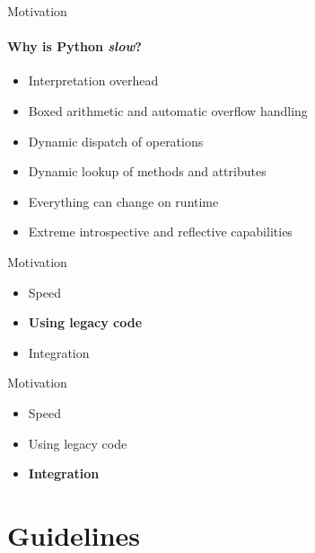 \documentclass{beamer}
\begin{document}
\begin{frame}{Motivation}
\framesubtitle{Why is Python \textit{slow}?}
  \begin{itemize}
    \item Interpretation overhead
    \item Boxed arithmetic and automatic overflow handling
    \item Dynamic dispatch of operations
    \item Dynamic lookup of methods and attributes
    \item Everything can change on runtime
    \item Extreme introspective and reflective capabilities
  \end{itemize}
\end{frame}

\begin{frame}{Motivation}
  \begin{itemize}
  \item Speed
  \item \textbf{Using legacy code}
  \item Integration
  \end{itemize}
\end{frame}

\begin{frame}{Motivation}
  \begin{itemize}
  \item Speed
  \item Using legacy code
  \item \textbf{Integration}
  \end{itemize}
\end{frame}

\section{Guidelines}



\end{document}
